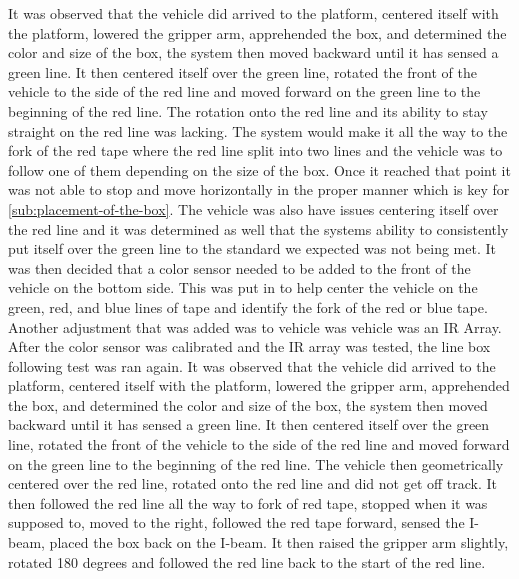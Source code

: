 \documentclass[11pt]{report}
\begin{document}
It was observed that the vehicle did arrived to the platform, centered itself with the platform, lowered the gripper arm, apprehended the box, and determined the color and size of the box, the system then moved backward until it has sensed a green line. It then centered itself over the green line, rotated the front of the vehicle to the side of the red line and moved forward on the green line to the beginning of the red line. The rotation onto the red line and its ability to stay straight on the red line was lacking. The system would make it all the way to the fork of the red tape where the red line split into two lines and the vehicle was to follow one of them depending on the size of the box. Once it reached that point it was not able to stop and move horizontally in the proper manner which is key for \cref{sub:placement-of-the-box}. The vehicle was also have issues centering itself over the red line and it was determined as well that the systems ability to consistently put itself over the green line to the standard we expected was not being met. It was then decided that a color sensor needed to be added to the front of the vehicle on the bottom side. This was put in to help center the vehicle on the green, red, and blue lines of tape and identify the fork of the red or blue tape. Another adjustment that was added was to vehicle was vehicle was an \gls{IR} Array. After the color sensor was calibrated and the \gls{IR} array was tested, the line box following test was ran again. It was observed that the vehicle did arrived to the platform, centered itself with the platform, lowered the gripper arm, apprehended the box, and determined the color and size of the box, the system then moved backward until it has sensed a green line. It then centered itself over the green line, rotated the front of the vehicle to the side of the red line and moved forward on the green line to the beginning of the red line. The vehicle then geometrically centered over the red line, rotated onto the red line and did not get off track. It then followed the red line all the way to fork of red tape, stopped when it was supposed to, moved to the right, followed the red tape forward, sensed the I-beam, placed the box back on the I-beam. It then raised the gripper arm slightly, rotated 180 degrees and followed the red line back to the start of the red line. 
\end{document}
